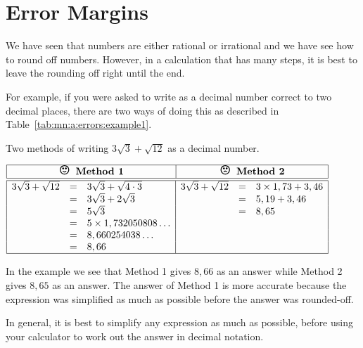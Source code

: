 \chapter{Error Margins}
\label{m:ng11}


We have seen that numbers are either rational or irrational and we have see how to round off numbers. However, in a calculation that has many steps, it is best to leave the rounding off right until the end.

For example, if you were asked to write
as a decimal number correct to two decimal places, there are two ways of doing this as described in Table~\ref{tab:mn:a:errors:example1}.

\begin{table}[htbp]
\begin{center}
\caption{Two methods of writing $3\sqrt{3}+\sqrt{12}$ as a decimal number.}
\label{tab:mn:a:errors:example1}
$\begin{array}{|rcl|rcl|}\hline
\multicolumn{3}{|c}{\textbf{\Large{\smiley} \normalsize Method 1}}& \multicolumn{3}{|c|}{\textbf{\Large{\frownie} \normalsize Method 2}}\\\hline\hline
3\sqrt{3}+\sqrt{12}&=&3\sqrt{3}+\sqrt{4\cdot 3} &3\sqrt{3}+\sqrt{12}&=&3 \times 1,73+3,46\\
&=&3\sqrt{3}+2\sqrt{3} &&=&5,19+3,46\\
&=&5\sqrt{3} &&=&8,65\\
&=&5 \times 1,732050808\ldots &&&\\
&=&8,660254038\ldots &&&\\
&=&8,66 &&&\\\hline
\end{array}$
\end{center}
\end{table}

In the example we see that Method 1 gives $8,66$ as an answer while Method 2 gives $8,65$ as an answer. The answer of Method 1 is more accurate because the expression was simplified as much as possible before the answer was rounded-off.

In general, it is best to simplify any expression as much as possible, before using your calculator to work out the answer in decimal notation.

